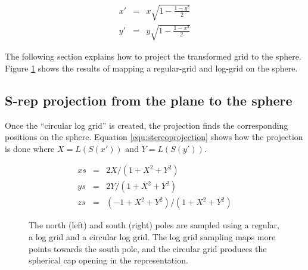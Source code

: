 \documentclass[a4paper,twoside]{article}
\begin{document}
\begin{equation}  
  \begin{array}{lcr}
    x' & = & x \sqrt{1 - \frac{1 - y^2}{2}} \\
    y' & = & y \sqrt{1 - \frac{1 - x^2}{2}} 
  \end{array}  
  \label{equ:squaretocircle}
\end{equation}


The following section explains how to project the transformed grid to the sphere.
Figure \ref{fig:SphereSamplingSphere} shows the results of mapping a regular-grid and log-grid on the sphere. 

\subsection{S-rep projection from the plane to the sphere}
\label{sec:StereographicProjection}

Once the ``circular log grid'' is created, the projection 
finds the corresponding positions on the sphere. 
Equation \ref{equ:stereoprojection} shows how the projection is done where $X = L(S(x'))$ and $Y = L(S(y'))$.

\begin{equation}  
  \begin{array}{lcc}
      xs & = & 2X/(1 + X^2 + Y^2) \\
      ys & = & 2Y/(1 + X^2 + Y^2) \\
      zs & = & (-1 + X^2 + Y^2)/(1 + X^2 + Y^2)
  \end{array}
  \label{equ:stereoprojection}
\end{equation}

\begin{figure}[h!]
 \centering 
          
 \caption[Sphere's north and south pole sampling.]{The north (left) and south (right) poles are sampled using a regular,  a log grid and a circular log grid. 
                 The log grid sampling maps more points towards the south pole, and the circular grid 
                 produces the spherical cap opening in the representation.}
 \label{fig:SphereSamplingSphere}  
\end{figure}
\end{document}

